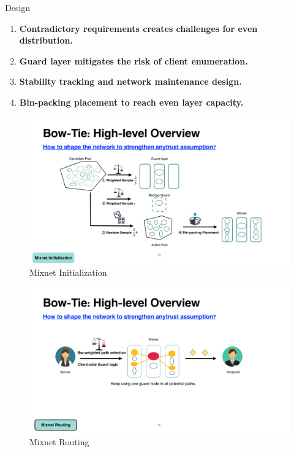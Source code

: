 \documentclass[final]{beamer}
\newlength{\maincolwidth}
\newlength{\rightcolwidth}
\begin{document}
\begin{frame}[t]
\begin{columns}[t]
\begin{column}{\maincolwidth}
\begin{alertblock}{Design}
    \begin{enumerate}
    \item \textbf{Contradictory requirements creates challenges for even distribution.}
    \item \textbf{Guard layer mitigates the risk of client enumeration.}
    \item \textbf{Stability tracking and network maintenance design.}
    \item \textbf{Bin-packing placement to reach even layer capacity.}
    \end{enumerate}
    
    \vspace{2cm}
    \begin{figure}[t]
    \includegraphics[width=0.95\rightcolwidth]{images/bowtie_init.pdf}
    \caption{Mixnet Initialization}
    \end{figure}
    \vspace{1cm}
    \begin{figure}[t]
    \includegraphics[width=0.95\rightcolwidth]{images/bowtie_routing.pdf}
    \caption{Mixnet Routing}
    \end{figure}
    \end{alertblock}
    

\end{column}
\end{columns}
\end{frame}
\end{document}
